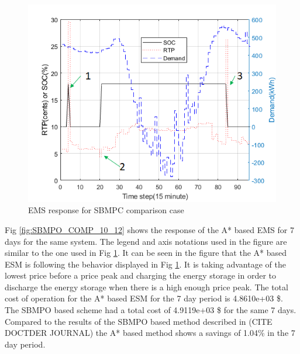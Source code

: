   \begin{figure}[!ht]
    \centering
    \includegraphics[width = \linewidth]{figs/SBMPO_COMP_1_day.png}
    \caption{EMS response for SBMPC comparison case}
    \label{fig:SBMPO_COMP_1_day}
\end{figure}

 Fig \ref{fig:SBMPO_COMP_10_12} shows the response of the A* based EMS for 7 days for the same system. The legend and axis notations used in the figure are similar to the one used in Fig \ref{fig:SBMPO_COMP_1_day}. It can be seen in the figure that the A* based ESM is following the behavior displayed in Fig \ref{fig:SBMPO_COMP_1_day}. It is taking advantage of the lowest price before a price peak and charging the energy storage in order to discharge the energy storage when there is a high enough price peak. The total cost of operation for the A* based ESM for the 7 day period is 4.8610e+03 \$. The SBMPO based scheme had a total cost of 4.9119e+03 \$ for the same 7 days. Compared to the results of the SBMPO based method described in \colorbox{BurntOrange}{(CITE DOCTDER JOURNAL)} the A* based method shows a savings of 1.04\% in the 7 day period.
 
